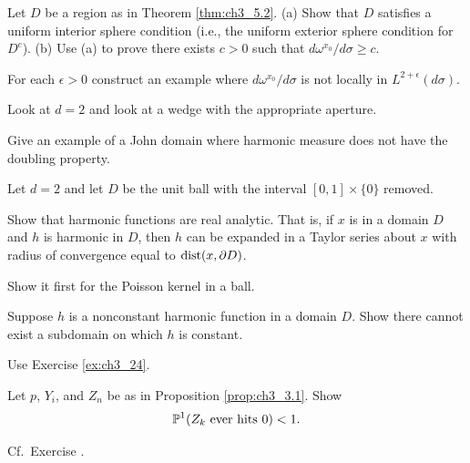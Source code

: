 \begin{exercise}\label{ex:ch3_21}
Let $D$ be a region as in Theorem \ref{thm:ch3_5.2}. (a) Show that $D$ satisfies a uniform interior sphere condition (i.e., the uniform exterior sphere condition for $D^c$). (b) Use (a) to prove there exists $c > 0$ such that $d\omega^{x_0}/d\sigma \geq c$.
\end{exercise}

\begin{exercise}\label{ex:ch3_22}
For each $\epsilon > 0$ construct an example where $d\omega^{x_0}/d\sigma$ is not locally in $L^{2+\epsilon}(d\sigma)$.

\hint Look at $d = 2$ and look at a wedge with the appropriate aperture.
\end{exercise}

\begin{exercise}\label{ex:ch3_23}
Give an example of a John domain where harmonic measure does not have the doubling property.

\hint Let $d = 2$ and let $D$ be the unit ball with the interval $[0,1] \times \{0\}$ removed.
\end{exercise}

\begin{exercise}\label{ex:ch3_24}
Show that harmonic functions are real analytic. That is, if $x$ is in a domain $D$ and $h$ is harmonic in $D$, then $h$ can be expanded in a Taylor series about $x$ with radius of convergence equal to $\dist(x,\partial D)$.

\hint Show it first for the Poisson kernel in a ball.
\end{exercise}

\begin{exercise}\label{ex:ch3_25}
Suppose $h$ is a nonconstant harmonic function in a domain $D$. Show there cannot exist a subdomain on which $h$ is constant.

\hint Use Exercise \ref{ex:ch3_24}.
\end{exercise}

\begin{exercise}\label{ex:ch3_26}
Let $p$, $Y_i$, and $Z_n$ be as in Proposition \ref{prop:ch3_3.1}. Show
\[
    \P^1(Z_k~\text{ever hits}~0) < 1.
\]

\hint Cf.\ Exercise .
\end{exercise}

\notessection
{}

